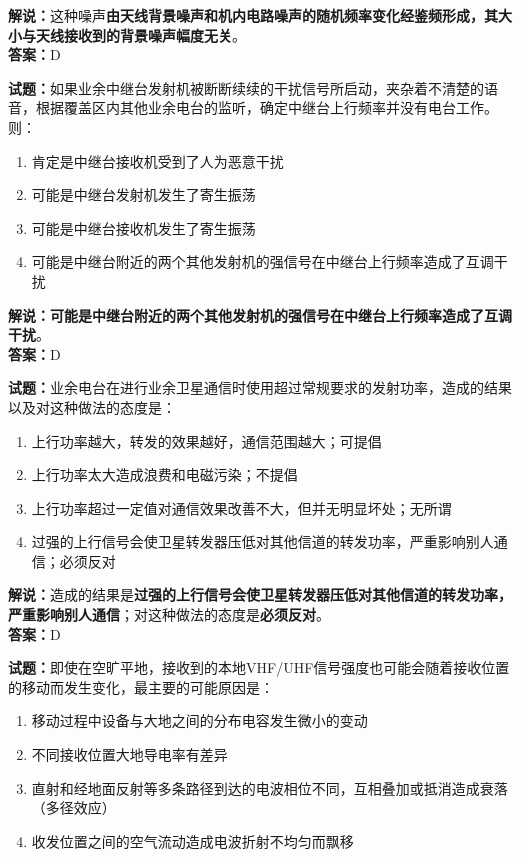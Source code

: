 \documentclass{ctexbook}
\begin{document}
\noindent\textbf{解说：}这种噪声\textbf{由天线背景噪声和机内电路噪声的随机频率变化经鉴频形成，其大小与天线接收到的背景噪声幅度无关}。\\\noindent\textbf{答案：}D%

\bigskip

\noindent\textbf{试题：}如果业余中继台发射机被断断续续的干扰信号所启动，夹杂着不清楚的语音，根据覆盖区内其他业余电台的监听，确定中继台上行频率并没有电台工作。则：

\begin{enumerate}[leftmargin=3em]
  \item 肯定是中继台接收机受到了人为恶意干扰
  \item 可能是中继台发射机发生了寄生振荡
  \item 可能是中继台接收机发生了寄生振荡
  \item 可能是中继台附近的两个其他发射机的强信号在中继台上行频率造成了互调干扰
\end{enumerate}

\noindent\textbf{解说：可能是中继台附近的两个其他发射机的强信号在中继台上行频率造成了互调干扰}。\\\noindent\textbf{答案：}D%

\bigskip

\noindent\textbf{试题：}业余电台在进行业余卫星通信时使用超过常规要求的发射功率，造成的结果以及对这种做法的态度是：

\begin{enumerate}[leftmargin=3em]
  \item 上行功率越大，转发的效果越好，通信范围越大；可提倡
  \item 上行功率太大造成浪费和电磁污染；不提倡
  \item 上行功率超过一定值对通信效果改善不大，但并无明显坏处；无所谓
  \item 过强的上行信号会使卫星转发器压低对其他信道的转发功率，严重影响别人通信；必须反对
\end{enumerate}

\noindent\textbf{解说：}造成的结果是\textbf{过强的上行信号会使卫星转发器压低对其他信道的转发功率，严重影响别人通信}；对这种做法的态度是\textbf{必须反对}。\\\noindent\textbf{答案：}D%

\bigskip

\noindent\textbf{试题：}即使在空旷平地，接收到的本地VHF/UHF信号强度也可能会随着接收位置的移动而发生变化，最主要的可能原因是：

\begin{enumerate}[leftmargin=3em]
  \item 移动过程中设备与大地之间的分布电容发生微小的变动
  \item 不同接收位置大地导电率有差异
  \item 直射和经地面反射等多条路径到达的电波相位不同，互相叠加或抵消造成衰落（多径效应）
  \item 收发位置之间的空气流动造成电波折射不均匀而飘移
\end{enumerate}
\end{document}
